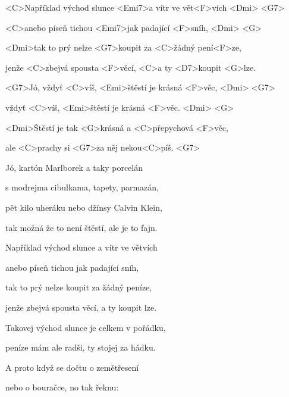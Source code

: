

\zs
<C>Například východ slunce <Emi7>a vítr ve vět<F>vích <Dmi> <G7>

<C>anebo píseň tichou <Emi7>jak padající <F>sníh, <Dmi> <G>

<Dmi>tak to prý nelze <G7>koupit za <C>žádný pení<F>ze,

jenže <C>zbejvá spousta <F>věcí, <C>a ty <D7>koupit <G>lze.
\ks

\zs
<G7>Jó, vždyť <C>víš, <Emi>štěstí je krásná <F>věc, <Dmi> <G7>

vždyť <C>víš, <Emi>štěstí je krásná <F>věc. <Dmi> <G>

<Dmi>Štěstí je tak <G>krásná a <C>přepychová <F>věc,

ale <C>prachy si <G7>za něj nekou<C>píš. <G7>
\ks

\zs
Jó, kartón Marlborek a taky porcelán

s modrejma cibulkama, tapety, parmazán,

pět kilo uheráku nebo džínsy Calvin Klein,

tak možná že to není štěstí, ale je to fajn.
\ks

\zr
Například východ slunce a vítr ve větvích

anebo píseň tichou jak padající sníh,

tak to prý nelze koupit za žádný peníze,

jenže zbejvá spousta věcí, a ty koupit lze.
\kr

\zs
Takovej východ slunce je celkem v pořádku,

peníze mám ale radši, ty stojej za hádku.

A proto když se dočtu o zemětřesení

nebo o bouračce, no tak řeknu: 
\ks

\zr \kr \zr \kr

\kp
